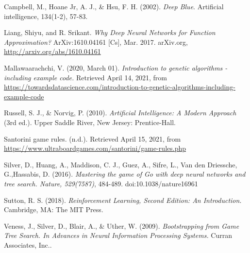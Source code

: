 \documentclass[a4paper,12pt,table]{article}
\begin{document}
\newpage
\begin{thebibliography}{9}

    Campbell, M., Hoane Jr, A. J., \& Hsu, F. H. (2002). \textit{Deep Blue}. Artificial intelligence, 134(1-2), 57-83.

    Liang, Shiyu, and R. Srikant. \textit{Why Deep Neural Networks for Function Approximation?} ArXiv:1610.04161 [Cs], Mar. 2017. arXiv.org, \href{http://arxiv.org/abs/1610.04161}{http://arxiv.org/abs/1610.04161}

    Mallawaarachchi, V. (2020, March 01). \textit{Introduction to genetic algorithms - including example code.} Retrieved April 14, 2021, from 
    \href{https://towardsdatascience.com/introduction-to-genetic-algorithms-including-example-code-e396e98d8bf3#:~:text=A%20genetic%20algorithm%20is%20a,offspring%20of%20the%20next%20generation.}{https://towardsdatascience.com/introduction-to-genetic-algorithms-including-example-code}

    Russell, S. J., \& Norvig, P. (2010). \textit{Artificial Intelligence: A Modern Approach} (3rd ed.). Upper Saddle River, New Jersey: Prentice-Hall.

    Santorini game rules. (n.d.). Retrieved April 15, 2021, from \href{https://www.ultraboardgames.com/santorini/game-rules.php}{https://www.ultraboardgames.com/santorini/game-rules.php}

    Silver, D., Huang, A., Maddison, C. J., Guez, A., Sifre, L., Van den Driessche, G.,Hassabis, D. (2016). \textit{Mastering the game of Go with deep neural networks and tree search. Nature, 529(7587)}, 484-489. doi:10.1038/nature16961

    Sutton, R. S. (2018). \textit{Reinforcement Learning, Second Edition: An Introduction.} Cambridge, MA: The MIT Press.

    Veness, J., Silver, D., Blair, A., \& Uther, W. (2009). \textit{Bootstrapping from Game Tree Search. In Advances in Neural Information Processing Systems.} Curran Associates, Inc..

\end{thebibliography}
\end{document}
